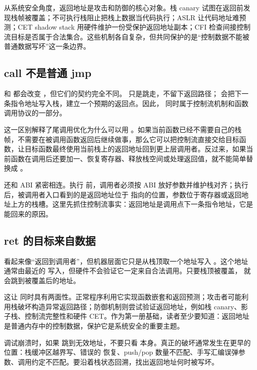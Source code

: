 从系统安全角度，返回地址是攻击和防御的核心对象。栈 canary 试图在返回前发现栈帧被覆盖；不可执行栈阻止把栈上数据当代码执行；ASLR 让代码地址难预测；CET shadow stack 用硬件维护一份受保护返回地址副本；CFI 检查间接控制流目标是否属于合法集合。这些机制各自复杂，但共同保护的是“控制数据不能被普通数据写坏”这一条边界。

\subsection{call 不是普通 jmp}

 和  都会改变 ，但它们的契约完全不同。 只是跳走，不留下返回路径； 会把下一条指令地址写入栈，建立一个预期的返回点。因此， 同时属于控制流机制和函数调用协议的一部分。

这一区别解释了尾调用优化为什么可以用 。如果当前函数已经不需要自己的栈帧，不需要在被调用函数返回后继续做事，那么它可以把控制流直接交给目标函数，让目标函数最终使用当前栈上的返回地址回到更上层调用者。反过来，如果当前函数在调用后还要加一、恢复寄存器、释放栈空间或处理返回值，就不能简单替换成 。

 还和 ABI 紧密相连。执行  前，调用者必须按 ABI 放好参数并维护栈对齐；执行  后，被调用者入口看到的是返回地址位于  指向的位置，参数位于寄存器或返回地址上方的栈槽。这里先抓住控制流事实：返回地址是调用点下一条指令地址，它是  能回来的原因。

\subsection{ret 的目标来自数据}

 看起来像“返回到调用者”，但机器层面它只是从栈顶取一个地址写入 。这个地址通常由最近的  写入，但硬件不会验证它一定来自合法调用。只要栈顶被覆盖， 就会跳到被覆盖后的地址。

这让  同时具有两面性。正常程序利用它实现函数嵌套和返回预测；攻击者可能利用栈破坏构造异常返回路径；防御机制则尝试验证返回地址，例如栈 canary、影子栈、控制流完整性和硬件 CET。作为第一册基础，读者至少要知道：返回地址是普通内存中的控制数据，保护它是系统安全的重要主题。

调试崩溃时，如果  跳到无效地址，不要只看  本身。真正的破坏通常发生在更早的位置：栈缓冲区越界写、错误的  恢复、push/pop 数量不匹配、手写汇编误弹参数、调用约定不匹配。要沿着栈状态回溯，找出返回地址何时被写坏。

